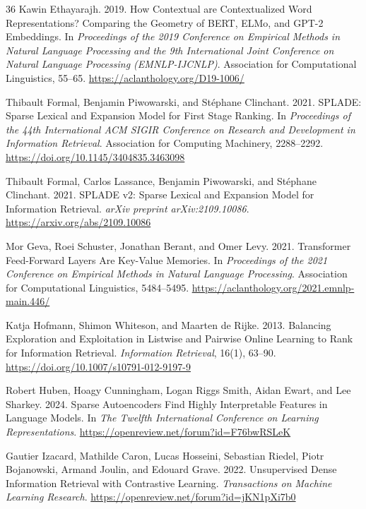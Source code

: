 \documentclass[sigconf]{acmart}
\begin{document}
\begin{thebibliography}{36}
Kawin Ethayarajh. 2019. How Contextual are Contextualized Word Representations? Comparing the Geometry of BERT, ELMo, and GPT-2 Embeddings. In \textit{Proceedings of the 2019 Conference on Empirical Methods in Natural Language Processing and the 9th International Joint Conference on Natural Language Processing (EMNLP-IJCNLP)}. Association for Computational Linguistics, 55–65. \url{https://aclanthology.org/D19-1006/}

Thibault Formal, Benjamin Piwowarski, and St\'ephane Clinchant. 2021. SPLADE: Sparse Lexical and Expansion Model for First Stage Ranking. In \textit{Proceedings of the 44th International ACM SIGIR Conference on Research and Development in Information Retrieval}. Association for Computing Machinery, 2288–2292. \url{https://doi.org/10.1145/3404835.3463098}

Thibault Formal, Carlos Lassance, Benjamin Piwowarski, and St\'ephane Clinchant. 2021. SPLADE v2: Sparse Lexical and Expansion Model for Information Retrieval. \textit{arXiv preprint arXiv:2109.10086}. \url{https://arxiv.org/abs/2109.10086}

Mor Geva, Roei Schuster, Jonathan Berant, and Omer Levy. 2021. Transformer Feed-Forward Layers Are Key-Value Memories. In \textit{Proceedings of the 2021 Conference on Empirical Methods in Natural Language Processing}. Association for Computational Linguistics, 5484–5495. \url{https://aclanthology.org/2021.emnlp-main.446/}

Katja Hofmann, Shimon Whiteson, and Maarten de Rijke. 2013. Balancing Exploration and Exploitation in Listwise and Pairwise Online Learning to Rank for Information Retrieval. \textit{Information Retrieval}, 16(1), 63--90. \url{https://doi.org/10.1007/s10791-012-9197-9}

Robert Huben, Hoagy Cunningham, Logan Riggs Smith, Aidan Ewart, and Lee Sharkey. 2024. Sparse Autoencoders Find Highly Interpretable Features in Language Models. In \textit{The Twelfth International Conference on Learning Representations}. \url{https://openreview.net/forum?id=F76bwRSLeK}

Gautier Izacard, Mathilde Caron, Lucas Hosseini, Sebastian Riedel, Piotr Bojanowski, Armand Joulin, and Edouard Grave. 2022. Unsupervised Dense Information Retrieval with Contrastive Learning. \textit{Transactions on Machine Learning Research}. \url{https://openreview.net/forum?id=jKN1pXi7b0}


\end{thebibliography}
\end{document}
